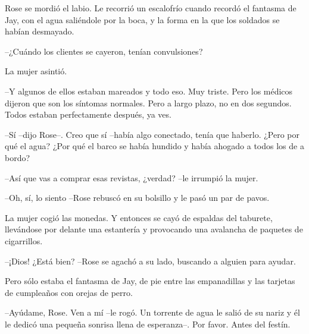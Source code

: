 {Rose se mordió el labio. Le recorrió un escalofrío cuando recordó el
 fantasma de Jay, con el agua saliéndole por la boca, y la forma en la
que los soldados se habían desmayado.}

{--¿Cuándo los clientes se cayeron, tenían convulsiones?}

{La mujer asintió.}

{--Y algunos de ellos estaban mareados y todo eso. Muy triste. Pero los
 médicos dijeron que son los síntomas normales. Pero a largo plazo, no en
dos segundos. Todos estaban perfectamente después, ya ves.}

{--Sí --dijo Rose--. Creo que sí --había algo conectado, tenía que
 haberlo. ¿Pero por qué el agua? ¿Por qué el barco se había hundido y
había ahogado a todos los de a bordo?}

{--Así que vas a comprar esas revistas, ¿verdad? --le irrumpió la
mujer.}

{--Oh, sí, lo siento --Rose rebuscó en su bolsillo y le pasó un par de
pavos.}

{La mujer cogió las monedas. Y entonces se cayó de espaldas del
 taburete, llevándose por delante una estantería y provocando una
avalancha de paquetes de cigarrillos.}

{--¡Dios! ¿Está bien? --Rose se agachó a su lado, buscando a alguien
para ayudar.}

{Pero sólo estaba el fantasma de Jay, de pie entre las empanadillas y
las tarjetas de cumpleaños con orejas de perro.}

{--Ayúdame, Rose. Ven a mí --le rogó. Un torrente de agua le salió de su
 nariz y él le dedicó una pequeña sonrisa llena de esperanza--. Por
favor. Antes del festín.}
